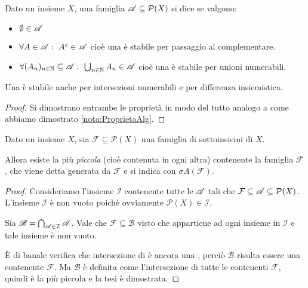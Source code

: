 \begin{definition}[\sigalg{}]
	Dato un insieme $X$, una famiglia $\mathscr A\subseteq\mathcal P(X)$ si dice \sigalg{} se valgono:
	\begin{itemize}
	\item $\emptyset\in \mathscr A$
	\item $\forall A\in \mathscr A:\ A^c\in \mathscr A$ cioè una \sigalg{} è stabile per passaggio al complementare.
	\item $\forall (A_n)_{n\in\N}\subseteq \A:\ \bigcup_{n\in\N} A_n\in \A$ cioè una \sigalg{} è stabile per unioni numerabili.  
	\end{itemize}
\end{definition}

\begin{remark}\label{nota:ProprietaSigAlg}
	Una \sigalg{} è stabile anche per intersezioni numerabili e per differenza insiemistica.
\end{remark}
\begin{proof}
	Si dimostrano entrambe le proprietà in modo del tutto analogo a come abbiamo dimostrato \cref{nota:ProprietaAlg}.
\end{proof}

\begin{proposition}\label{prop:SigmaAlgGenerata}
	Dato un insieme $X$, sia $\mathcal F\subseteq\mathcal P(X)$ una famiglia di sottoinsiemi di $X$.
	
	Allora esiste la più \emph{piccola} (cioè contenuta in ogni altra) \sigalg{} contenente la famiglia $\mathcal F$, che viene detta \sigalg{} generata da $\mathcal F$ e si indica con $\sigma A(\mathcal F)$.
\end{proposition}
\begin{proof}
	Consideriamo l'insieme $\mathcal I$ contenente tutte le \sigalg[e] $\mathscr A$ tali che $\mathcal F\subseteq \mathscr A \subseteq \mathcal P(X)$.
	L'insieme $\mathcal I$ è non vuoto poichè ovviamente $\mathcal P(X)\in\mathcal I$.
	
	Sia $\mathscr B=\bigcap_{\mathscr A\in\mathcal I} \mathscr A$.
	Vale che $\mathcal F\subseteq \mathscr B$ visto che appartiene ad ogni insieme in $\mathcal I$ e tale insieme è non vuoto.
	
	È di banale verifica che intersezione di \sigalg[e] è ancora una \sigalg{}, perciò $\mathscr B$ risulta essere una \sigalg{} contenente $\mathcal F$. Ma $\mathscr B$ è definita come l'intersezione di tutte le \sigalg{} contenenti $\mathcal F$, quindi è la più piccola e la tesi è dimostrata.
\end{proof}


